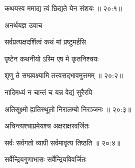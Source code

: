 
{\devanagarifont कथयस्व ममाद्य त्वं छिद्यते येन संशयः {॥ २०:१॥} \veg\dontdisplaylinenum }%
 

{\devanagarifont अनर्थयज्ञ उवाच {\dandab}\dontdisplaylinenum  }%
 
{\devanagarifont सर्वप्रत्यक्षदर्शित्वं कथं मां प्रष्टुमर्हसि \thinspace{\danda} \dontdisplaylinenum }%

{\devanagarifont पृष्टेन कथनीयो ऽस्मि एष मे कृतनिश्चयः  \danda\dontdisplaylinenum }%


{\devanagarifont शृणु ते सम्प्रवक्ष्यामि तत्त्वसद्भावमुत्तमम् {॥ २०:२॥} \veg\dontdisplaylinenum }%
 

{\devanagarifont नादिमध्यं न चान्तं च यन्न वेद्यं सुरैरपि \thinspace{\dandab} \dontdisplaylinenum }%


{\devanagarifont अतिसूक्ष्मो ह्यतिस्थूलो निरालम्बो निरञ्जनः {॥ २०:३॥} \veg\dontdisplaylinenum }%

{\devanagarifont अचिन्त्यश्चाप्रमेयश्च अक्षराक्षरवर्जितः \thinspace{\dandab} \dontdisplaylinenum }%
 

{\devanagarifont सर्वः सर्वगतो व्यापी सर्वमावृत्य तिष्ठति {॥ २०:४॥} \veg\dontdisplaylinenum }%

{\devanagarifont सर्वेन्द्रियगुणाभासः सर्वेन्द्रियविवर्जितः \thinspace{\dandab} \dontdisplaylinenum }%

